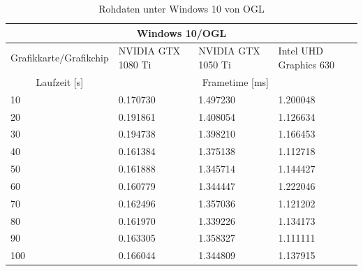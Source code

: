 \documentclass[titlepage, 11pt, a4paper, ngerman]{article}
\begin{document}
\begin{table}[ht]
    \centering
    \caption[Rohdaten unter Windows 10 von OGL]{Rohdaten unter Windows 10 von OGL}
    \bigbreak
    \begin{tabular}{|p{4cm}||p{2.5cm}|p{2.5cm}|p{3cm}|}
    \hline
    \multicolumn{4}{|c|}{Windows 10/OGL} \\
    \hline
    Grafikkarte/Grafikchip & NVIDIA GTX 1080 Ti & NVIDIA GTX 1050 Ti & Intel UHD Graphics 630 \\
    \hline
    \hline
    \multicolumn{1}{|c||}{Laufzeit [s]} & \multicolumn{3}{|c|}{\gls{Frametime} [ms]} \\
    \hline
    10 & 0.170730 & 1.497230 & 1.200048 \\
    \hline
    20 & 0.191861 & 1.408054 & 1.126634 \\
    \hline
    30 & 0.194738 & 1.398210 & 1.166453 \\
    \hline
    40 & 0.161384 & 1.375138 & 1.112718 \\
    \hline
    50 & 0.161888 & 1.345714 & 1.144427 \\
    \hline
    60 & 0.160779 & 1.344447 & 1.222046 \\
    \hline
    70 & 0.162496 & 1.357036 & 1.121202 \\
    \hline
    80 & 0.161970 & 1.339226 & 1.134173 \\
    \hline
    90 & 0.163305 & 1.358327 & 1.111111 \\
    \hline
    100 & 0.166044 & 1.344809 & 1.137915 \\
    \hline
    \end{tabular}
    \label{tab:results-raw-win-ogl}
\end{table}
\pagebreak
\end{document}

